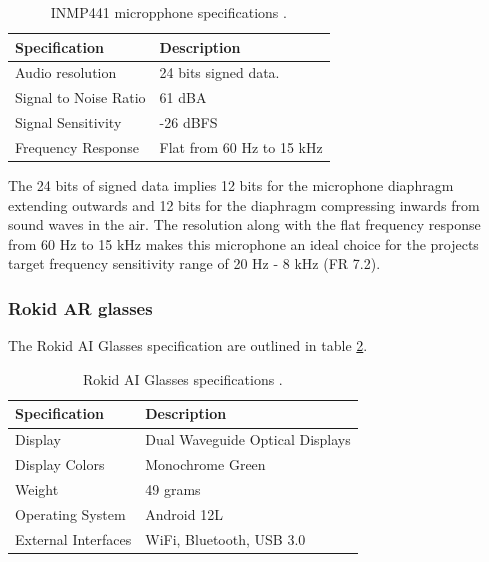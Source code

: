 \documentclass[12pt, titlepage]{article}
\begin{document}
\begin{table}[H]
    \centering
    \begin{tabularx}{\textwidth}{|X|X|}
        \hline
        \textbf{Specification} & \textbf{Description}\\ \hline
        Audio resolution & 24 bits signed data. \\ \hline
        Signal to Noise Ratio & 61 dBA \\ \hline
        Signal Sensitivity & -26 dBFS \\ \hline
        Frequency Response & Flat from 60 Hz to 15 kHz \\ \hline
    \end{tabularx}
    \caption{INMP441 micropphone specifications \cite{inmp441_datasheet}.}
    \label{tab:mic_spec}
\end{table}

The 24 bits of signed data implies 12 bits for the microphone diaphragm
extending outwards and 12 bits for the diaphragm compressing inwards from sound
waves in the air. The resolution along with the flat frequency response from 60
Hz to 15 kHz makes this microphone an ideal choice for the projects target
frequency sensitivity range of 20 Hz - 8 kHz (FR 7.2).

\subsubsection{Rokid AR glasses}

The Rokid AI Glasses specification are outlined in table \ref{tab:rokid_spec}.
\begin{table}[H]
    \centering
    \begin{tabularx}{\textwidth}{|X|X|}
        \hline
        \textbf{Specification} & \textbf{Description}\\ \hline
        Display & Dual Waveguide Optical Displays \\ \hline
        Display Colors & Monochrome Green \\ \hline
        Weight & 49 grams \\ \hline
        Operating System & Android 12L \\ \hline
        External Interfaces & WiFi, Bluetooth, USB 3.0 \\ \hline
    \end{tabularx}
    \caption{Rokid AI Glasses specifications \cite{RokidGlasses,rokid_ks}.}
    \label{tab:rokid_spec}
\end{table}
\end{document}
